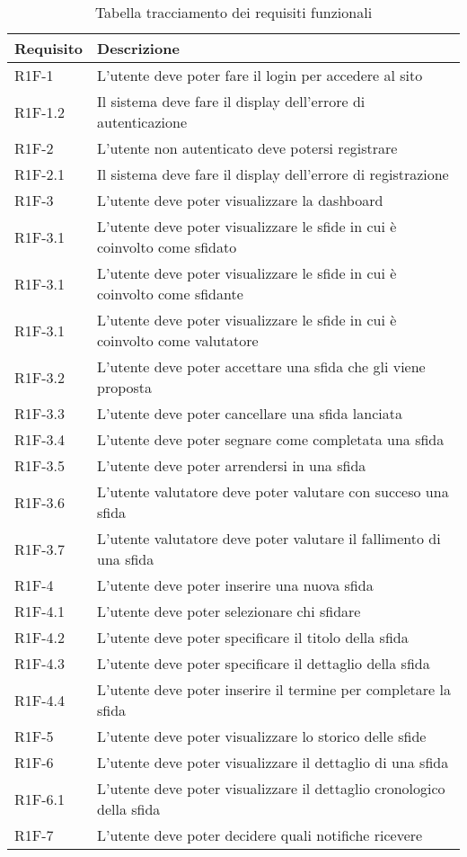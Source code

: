 \begin{longtable}[H]{ll}
    \caption{Tabella tracciamento dei requisiti funzionali} \\
    \textbf{Requisito} & \textbf{Descrizione} \\\hline
    R1F-1 & L’utente deve poter fare il login per accedere al sito \\\hline
    R1F-1.2 & Il sistema deve fare il display dell’errore di autenticazione \\\hline
    R1F-2 & L’utente non autenticato deve potersi registrare \\\hline
    R1F-2.1 & Il sistema deve fare il display dell’errore di registrazione \\\hline
    R1F-3 & L’utente deve poter visualizzare la dashboard \\\hline
    R1F-3.1 & L’utente deve poter visualizzare le sfide in cui è coinvolto come sfidato \\\hline
    R1F-3.1 & L’utente deve poter visualizzare le sfide in cui è coinvolto come sfidante \\\hline
    R1F-3.1 & L’utente deve poter visualizzare le sfide in cui è coinvolto come valutatore \\\hline
    R1F-3.2 & L’utente deve poter accettare una sfida che gli viene proposta \\\hline
    R1F-3.3 & L’utente deve poter cancellare una sfida lanciata \\\hline
    R1F-3.4 & L’utente deve poter segnare come completata una sfida \\\hline
    R1F-3.5 & L’utente deve poter arrendersi in una sfida \\\hline
    R1F-3.6 & L’utente valutatore deve poter valutare con succeso una sfida \\\hline
    R1F-3.7 & L’utente valutatore deve poter valutare il fallimento di una sfida \\\hline
    R1F-4 & L’utente deve poter inserire una nuova sfida \\\hline
    R1F-4.1 & L’utente deve poter selezionare chi sfidare \\\hline
    R1F-4.2 & L’utente deve poter specificare il titolo della sfida \\\hline
    R1F-4.3 & L’utente deve poter specificare il dettaglio della sfida \\\hline
    R1F-4.4 & L’utente deve poter inserire il termine per completare la sfida \\\hline
    R1F-5 & L’utente deve poter visualizzare lo storico delle sfide \\\hline
    R1F-6 & L’utente deve poter visualizzare il dettaglio di una sfida \\\hline
    R1F-6.1 & L’utente deve poter visualizzare il dettaglio cronologico della sfida \\\hline
    R1F-7 & L'utente deve poter decidere quali notifiche ricevere \\\hline
\end{longtable}

